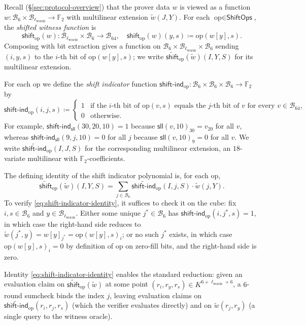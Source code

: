 \documentclass{article}
\theoremstyle{definition}
\newcommand*{\mle}{\widetilde}
\newcommand{\BB}{\mathcal{B}}
\newcommand{\FF}[1]{\mathbb{F}_{#1}}
\begin{document}
Recall (\S\ref{sec:protocol-overview}) that the prover data $w$ is viewed as a function $w \colon \BB_6 \times \BB_{\ell_\text{words}} \to \FF{2}$ with multilinear extension $\mle{w}(J, Y)$. For each $\text{op} \in \textsf{ShiftOps}$, the \emph{shifted witness function} is
\[
  \textsf{shift}_\text{op}(w) \colon \BB_{\ell_\text{words}} \times \BB_6 \to \BB_{64}, \quad \textsf{shift}_\text{op}(w)(y, s) \coloneqq \text{op}(w[y], s).
\]
Composing with bit extraction gives a function on $\BB_6 \times \BB_{\ell_\text{words}} \times \BB_6$ sending $(i, y, s)$ to the $i$-th bit of $\text{op}(w[y], s)$; we write $\mle{\textsf{shift}}_\text{op}(\mle{w})(I, Y, S)$ for its multilinear extension.

For each $\text{op}$ we define the \emph{shift indicator} function $\textsf{shift-ind}_\text{op} \colon \BB_6 \times \BB_6 \times \BB_6 \to \FF{2}$ by
\[
  \textsf{shift-ind}_\text{op}(i, j, s) \coloneqq \begin{cases} 1 & \text{if the $i$-th bit of $\text{op}(v, s)$ equals the $j$-th bit of $v$ for every $v \in \BB_{64}$,} \\ 0 & \text{otherwise.} \end{cases}
\]
For example, $\textsf{shift-ind}_\textsf{sll}(30, 20, 10) = 1$ because $\textsf{sll}(v, 10)_{30} = v_{20}$ for all $v$, whereas $\textsf{shift-ind}_\textsf{sll}(9, j, 10) = 0$ for all $j$ because $\textsf{sll}(v, 10)_9 = 0$ for all $v$. We write $\mle{\textsf{shift-ind}}_\text{op}(I, J, S)$ for the corresponding multilinear extension, an $18$-variate multilinear with $\FF{2}$-coefficients.

The defining identity of the shift indicator polynomial is, for each $\text{op}$,
\begin{equation}
  \mle{\textsf{shift}}_\text{op}(\mle{w})(I, Y, S) = \sum_{j \in \BB_6} \mle{\textsf{shift-ind}}_\text{op}(I, j, S) \cdot \mle{w}(j, Y).
  \label{eq:shift-indicator-identity}
\end{equation}
To verify \eqref{eq:shift-indicator-identity}, it suffices to check it on the cube: fix $i, s \in \BB_6$ and $y \in \BB_{\ell_\text{words}}$. Either some unique $j^* \in \BB_6$ has $\textsf{shift-ind}_\text{op}(i, j^*, s) = 1$, in which case the right-hand side reduces to $\mle{w}(j^*, y) = w[y]_{j^*} = \text{op}(w[y], s)_i$; or no such $j^*$ exists, in which case $\text{op}(w[y], s)_i = 0$ by definition of $\text{op}$ on zero-fill bits, and the right-hand side is zero.

Identity \eqref{eq:shift-indicator-identity} enables the standard reduction: given an evaluation claim on $\mle{\textsf{shift}}_\text{op}(\mle{w})$ at some point $(r_i, r_y, r_s) \in K^{6 + \ell_\text{words} + 6}$, a $6$-round sumcheck binds the index $j$, leaving evaluation claims on $\mle{\textsf{shift-ind}}_\text{op}(r_i, r_j, r_s)$ (which the verifier evaluates directly) and on $\mle{w}(r_j, r_y)$ (a single query to the witness oracle).
\end{document}
